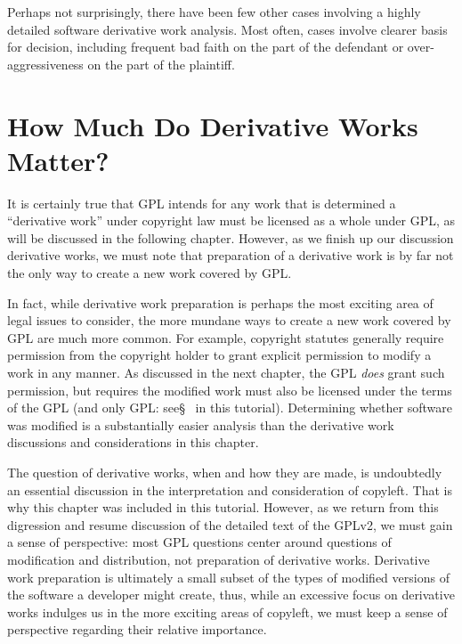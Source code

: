 Perhaps not surprisingly, there have been few other cases involving a highly
detailed software derivative work analysis. Most often, cases involve
clearer basis for decision, including frequent bad faith on the part of
the defendant or over-aggressiveness on the part of the plaintiff.  

\section{How Much Do Derivative Works Matter?}

It is certainly true that GPL intends for any work that is determined a
``derivative work'' under copyright law must be licensed as a whole under
GPL\@, as will be discussed in the following chapter.  However, as we finish
up our discussion derivative works, we must note that preparation of a
derivative work is by far not the only way to create a new work covered by
GPL\@.

In fact, while derivative work preparation is perhaps the most exciting area
of legal issues to consider, the more mundane ways to create a new work
covered by GPL are much more common.  For example, copyright statutes
generally require permission from the copyright holder to grant explicit
permission to modify a work in any manner.  As discussed in the next chapter,
the GPL {\em does} grant such permission, but requires the modified work must
also be licensed under the terms of the GPL (and only GPL:
see\S~\label{GPLv2s6} in this tutorial).  Determining whether software was
modified is a substantially easier analysis than the derivative work
discussions and considerations in this chapter.

The question of derivative works, when and how they are made, is undoubtedly
an essential discussion in the interpretation and consideration of copyleft.
That is why this chapter was included in this tutorial.  However, as we
return from this digression and resume discussion of the detailed text of the
GPLv2, we must gain a sense of perspective: most GPL questions center around
questions of modification and distribution, not preparation of derivative
works.  Derivative work preparation is ultimately a small subset of the types
of modified versions of the software a developer might create, thus, while an
excessive focus on derivative works indulges us in the more exciting areas of
copyleft, we must keep a sense of perspective regarding their relative
importance.


